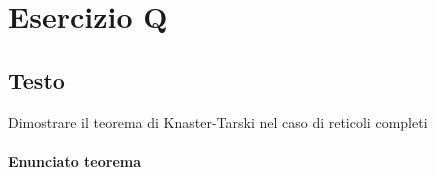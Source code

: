 \documentclass{article}
\begin{document}
\begin{comment}
\paragraph{Caso Induttivo S=$\sum_{i\inI}Pi$} In questo caso $S=P_{1}+P_{2}+P_{3}+...$ e per ipotesi induttiva sappiamo che ogni $Pi$ è finito e termina in un numero finito di passi. In questo caso il processo $S$ fa un passo e va in $S'=Pi$ per qualche $i \in I$, quindi $size(S') = size(Pi)$ che per ipotesi è finita dato che il processo termina; $size(S)=max\{size(Pi), i\in I\}$ ma siccome ogni processo $Pi$ è finito per ipotesi, il massimo elemento è comunque finito, e quindi il processo termina in un numero finito di passi dato se si aggiunge un passo (quello della scelta).


Alt: se ci sono $0$ processi il caso base è banale. Per $n+1$ processi sappiamo che per $n$ è vero per ipotesi induttiva$_{2}$ e aggiungendo un processo $P_{n+1}$, quindi la scelta si riduce tra gli $n$ programmi precedenti e l'$n+1$esimo, ma $P_{n+1}$ ha derivazione di lunghezza finita per ipotesi, per cui siccome il numero di passi di S è delimitato dal numero di passi del più grade processo $P_{i}$ all'interno della somma, se tutti sono finiti anche $S$ sarà finito.

\end{comment}




\section{Esercizio Q}
\subsection{Testo}
Dimostrare il teorema di Knaster-Tarski nel caso di reticoli completi


\paragraph{Enunciato teorema}
\end{document}
